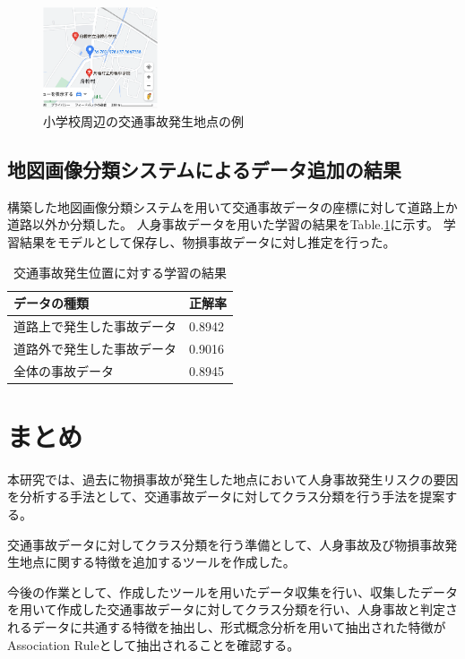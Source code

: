 \documentclass[a4j,8.5pt, twocolumn,fleqn]{jbook}
\begin{document}
\begin{figure}[htb]
    \centering
    \includegraphics[height=30mm]{images/shougakkou_gmap.png}
    \vspace{-3mm}
    \caption{小学校周辺の交通事故発生地点の例}
    \label{shougakkou_gmap}
\end{figure}

\subsection{地図画像分類システムによるデータ追加の結果}
構築した地図画像分類システムを用いて交通事故データの座標に対して道路上か道路以外か分類した。
人身事故データを用いた学習の結果をTable.\ref{table_road}に示す。
学習結果をモデルとして保存し、物損事故データに対し推定を行った。


\begin{table}[htb]
    \centering
    \caption{交通事故発生位置に対する学習の結果}
    \label{table_road}
    \begin{tabular}{|l|l|}
        \hline
        \textbf{データの種類} & \textbf{正解率} \\ \hline
        道路上で発生した事故データ   & 0.8942       \\ \hline
        道路外で発生した事故データ   & 0.9016       \\ \hline
        全体の事故データ        & 0.8945       \\ \hline
    \end{tabular}
\end{table}

\section{まとめ}
本研究では、過去に物損事故が発生した地点において人身事故発生リスクの要因を分析する手法として、交通事故データに対してクラス分類を行う手法を提案する。

交通事故データに対してクラス分類を行う準備として、人身事故及び物損事故発生地点に関する特徴を追加するツールを作成した。

今後の作業として、作成したツールを用いたデータ収集を行い、収集したデータを用いて作成した交通事故データに対してクラス分類を行い、人身事故と判定されるデータに共通する特徴を抽出し、形式概念分析を用いて抽出された特徴がAssociation Ruleとして抽出されることを確認する。
\end{document}
